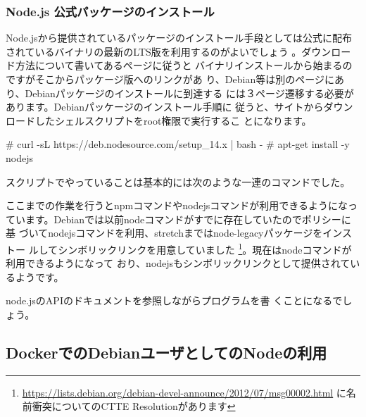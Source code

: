 \documentclass[mingoth,a4paper]{jsarticle}
\begin{document}
\subsubsection{Node.js 公式パッケージのインストール}

Node.jsから提供されているパッケージのインストール手段としては公式に配布
されているバイナリの最新のLTS版を利用するのがよいでしょう
\cite{nodejs-install}。ダウンロード方法について書いてあるページに従うと
バイナリインストールから始まるのですがそこからパッケージ版へのリンクがあ
り、Debian等は別のページにあり、Debianパッケージのインストールに到達する
には３ページ遷移する必要があります。Debianパッケージのインストール手順に
従うと、サイトからダウンロードしたシェルスクリプトをroot権限で実行するこ
とになります。

\begin{commandline}
# curl -sL https://deb.nodesource.com/setup_14.x | bash -
# apt-get install -y nodejs
\end{commandline}

スクリプトでやっていることは基本的には次のような一連のコマンドでした。


ここまでの作業を行うとnpmコマンドやnodejsコマンドが利用できるようになっ
ています。Debianでは以前nodeコマンドがすでに存在していたのでポリシーに基
づいてnodejsコマンドを利用、stretchまではnode-legacyパッケージをインストー
ルしてシンボリックリンクを用意していました
\footnote{\url{https://lists.debian.org/debian-devel-announce/2012/07/msg00002.html}
に名前衝突についてのCTTE Resolutionがあります}。現在はnodeコマンドが利用できるようになって
おり、nodejsもシンボリックリンクとして提供されているようです。

node.jsのAPIのドキュメント\cite{nodejs-api}を参照しながらプログラムを書
くことになるでしょう。

\subsection{DockerでのDebianユーザとしてのNodeの利用}
\end{document}
